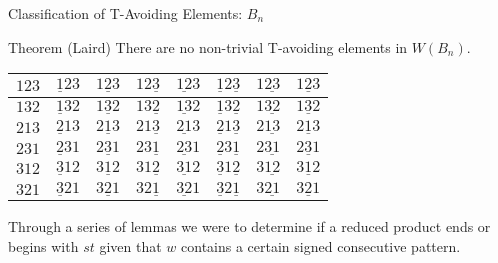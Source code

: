 \documentclass{beamer}
\begin{document}
\begin{frame}{Classification of T-Avoiding Elements: $B_n$}

\begin{block}{Theorem (Laird)}
	There are no non-trivial T-avoiding elements in $W(B_n)$.
\end{block}

\begin{center}
\begin{tabular}{|l|l|l|l|l|l|l|l|}
\hline
\cellcolor{blue!30}$123$ & \cellcolor{orange2!40}$\underline{1}23$ & \cellcolor{brown!50}$1\underline{2}3$ & \cellcolor{red!25}$12\underline{3}$ & \cellcolor{brown!50}$\underline{12}3$ & \cellcolor{red!25}$\underline{1}2\underline{3}$ & \cellcolor{turq!40}$1\underline{23}$ & \cellcolor{turq!40}$\underline{123}$ \\
\hline
\cellcolor{blue!30}$132$ & \cellcolor{orange2!40}$\underline{1}32$ & \cellcolor{brown!50}$1\underline{3}2$ & \cellcolor{red!25}$13\underline{2}$ & \cellcolor{brown!50}$\underline{13}2$ & \cellcolor{red!25}$\underline{1}3\underline{2}$ & \cellcolor{ggreen!50}$1\underline{32}$ & \cellcolor{ggreen!50}$\underline{132}$ \\
\hline
\cellcolor{blue!30}$213$ & \cellcolor{yellow!50}$\underline{2}13$ & \cellcolor{brown!50}$2\underline{1}3$ & \cellcolor{turq!40}$21\underline{3}$ & \cellcolor{yellow!50}$\underline{21}3$ & \cellcolor{red!25}$\underline{2}1\underline{3}$ & \cellcolor{turq!40}$2\underline{13}$ & \cellcolor{red!25}$\underline{213}$ \\
\hline
\cellcolor{red!25}$231$ & \cellcolor{purple2!50}$\underline{2}31$ & \cellcolor{ggreen!50}$2\underline{3}1$ & \cellcolor{red!25}$23\underline{1}$ & \cellcolor{brown!50}$\underline{23}1$ & \cellcolor{purple2!50}$\underline{2}3\underline{1}$ & \cellcolor{ggreen!50}$2\underline{31}$ & \cellcolor{brown!50}$\underline{231}$ \\
\hline
\cellcolor{ggreen!50}$312$ & \cellcolor{yellow!50}$\underline{3}12$ & \cellcolor{ggreen!50}$3\underline{1}2$ &\cellcolor{turq!40}$31\underline{2}$ & \cellcolor{yellow!50}$\underline{31}2$ & \cellcolor{yellow!50}$\underline{3}1\underline{2}$ & \cellcolor{turq!40}$3\underline{12}$ & \cellcolor{yellow!50}$\underline{312}$ \\
\hline
\cellcolor{turq!40}$321$ & \cellcolor{yellow!50}$\underline{3}21$ & \cellcolor{ggreen!50}$3\underline{2}1$ & \cellcolor{turq!40}$32\underline{1}$ & \cellcolor{yellow!50}$\underline{32}1$ & \cellcolor{yellow!50}$\underline{3}2\underline{1}$ & \cellcolor{ggreen!50}$3\underline{21}$ & \cellcolor{yellow!50}$\underline{321}$\\
\hline
\end{tabular}
\end{center}

Through a series of lemmas we were to determine if a reduced product ends or begins with $st$ given that $w$ contains a certain signed consecutive pattern.

\end{frame}
\end{document}
